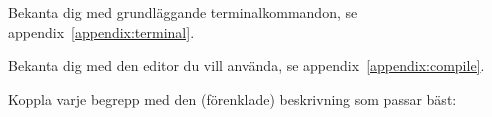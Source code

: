 

\ifPreSolution

\Exercise{\ExeWeekTWO}\label{exe:W02}
\begin{Goals}

\end{Goals}

\begin{Preparations}
\item {}
\item Bekanta dig med grundläggande terminalkommandon, se appendix~\ref{appendix:terminal}.
\item Bekanta dig med den editor du vill använda, se appendix~\ref{appendix:compile}.
\end{Preparations}

\else

\ExerciseSolution{\ExeWeekTWO}

\fi




\BasicTasksNoLab %





\QUESTBEGIN

\Task \what

\vspace{1em}\noindent Koppla varje begrepp med den (förenklade) beskrivning som passar bäst: 

\begin{ConceptConnections}

\end{ConceptConnections}

\SOLUTION

\TaskSolved \what

\begin{ConceptConnections}

\end{ConceptConnections}

\QUESTEND











\QUESTBEGIN

